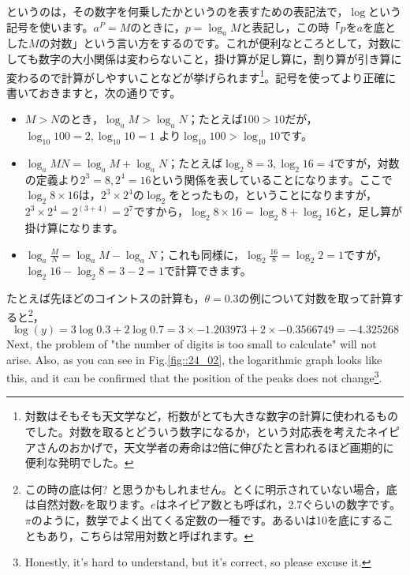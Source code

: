 \documentclass{ltjsbook}
\begin{document}
というのは，その数字を何乗したかというのを表すための表記法で，$\log$という記号を使います。$a^P=M$のときに，$p = \log_a M$と表記し，この時「$p$を$a$を底とした$M$の対数」という言い方をするのです。これが便利なところとして，対数にしても数字の大小関係は変わらないこと，掛け算が足し算に，割り算が引き算に変わるので計算がしやすいことなどが挙げられます\footnote{対数はそもそも天文学など，桁数がとても大きな数字の計算に使われるものでした。対数を取るとどういう数字になるか，という対応表を考えたネイピアさんのおかげで，天文学者の寿命は2倍に伸びたと言われるほど画期的に便利な発明でした。}。記号を使ってより正確に書いておきますと，次の通りです。
\begin{itemize}
	\item $ M > N $のとき，$\log_a M> \log_aN$；たとえば$100 > 10$だが，$\log_{10} 100 = 2, \log_{10} 10 =1$ より$\log_{10} 100 > \log_{10} 10$です。
	\item $\log_a MN = \log_a M +\log_a N$；たとえば$\log_2 8 =3,\log_2 16 = 4$ですが，対数の定義より$2^3=8,2^4=16$という関係を表していることになります。ここで$\log_2 8\times 16$は，$2^3 \times 2^4$の$\log_2$をとったもの，ということになりますが，$2^3 \times 2^4 = 2^{(3+4)}=2^7$ですから，$\log_2 8\times16 = \log_2 8 + \log_2 16$と，足し算が掛け算になります。
	\item $\log_a \frac{M}{N} = \log_a M - \log_a N$；これも同様に，$\log_2 \frac{16}{8}=\log_2 2=1$ですが，$\log_2 16 - \log_2 8 = 3-2=1$で計算できます。
\end{itemize}

たとえば先ほどのコイントスの計算も，$\theta=0.3$の例について対数を取って計算すると\footnote{この時の底は何? と思うかもしれません。とくに明示されていない場合，底は自然対数$e$を取ります。$e$はネイピア数とも呼ばれ，2.7ぐらいの数字です。$\pi$のように，数学でよく出てくる定数の一種です。あるいは10を底にすることもあり，こちらは常用対数と呼ばれます。}，
\[ \log(y) = 3\log 0.3 +2\log 0.7 = 3 \times -1.203973 + 2\times -0.3566749 = -4.325268 \]
Next, the problem of "the number of digits is too small to calculate" will not arise. Also, as you can see in Fig.\ref{fig::24_02}, the logarithmic graph looks like this, and it can be confirmed that the position of the peaks does not change\footnote{Honestly, it's hard to understand, but it's correct, so please excuse it.}.

\end{document}
